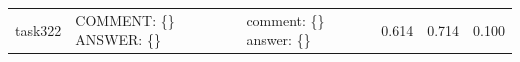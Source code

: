 \begin{table}[]
\begin{tabular}{@{}cp{4.2cm\ttfamily\tiny}p{4.2cm\ttfamily\tiny}ccc@{}}
task322    & COMMENT: \{\} ANSWER: \{\}                                                                                                                                                  & comment: \{\} answer: \{\}                                                                                                                                                            & 0.614  & 0.714  & 0.100     \\

\end{tabular}
\end{table}
